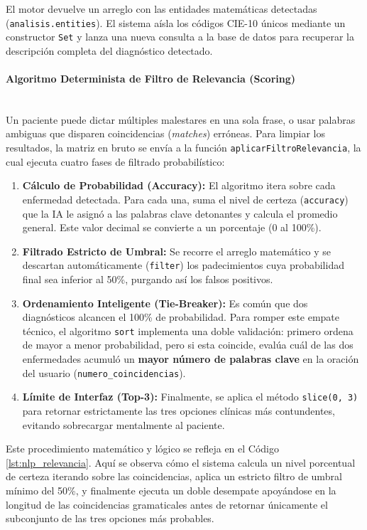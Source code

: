 El motor devuelve un arreglo con las entidades matemáticas detectadas (\texttt{analisis.entities}). El sistema aísla los códigos CIE-10 únicos mediante un constructor \texttt{Set} y lanza una nueva consulta a la base de datos para recuperar la descripción completa del diagnóstico detectado.

\paragraph{Algoritmo Determinista de Filtro de Relevancia (Scoring)} \leavevmode \\
Un paciente puede dictar múltiples malestares en una sola frase, o usar palabras ambiguas que disparen coincidencias (\emph{matches}) erróneas. Para limpiar los resultados, la matriz en bruto se envía a la función \texttt{aplicarFiltroRelevancia}, la cual ejecuta cuatro fases de filtrado probabilístico:

\begin{enumerate}
    \item \textbf{Cálculo de Probabilidad (Accuracy):} El algoritmo itera sobre cada enfermedad detectada. Para cada una, suma el nivel de certeza (\texttt{accuracy}) que la IA le asignó a las palabras clave detonantes y calcula el promedio general. Este valor decimal se convierte a un porcentaje (0 al 100\%).
    \item \textbf{Filtrado Estricto de Umbral:} Se recorre el arreglo matemático y se descartan automáticamente (\texttt{filter}) los padecimientos cuya probabilidad final sea inferior al 50\%, purgando así los falsos positivos.
    \item \textbf{Ordenamiento Inteligente (Tie-Breaker):} Es común que dos diagnósticos alcancen el 100\% de probabilidad. Para romper este empate técnico, el algoritmo \texttt{sort} implementa una doble validación: primero ordena de mayor a menor probabilidad, pero si esta coincide, evalúa cuál de las dos enfermedades acumuló un \textbf{mayor número de palabras clave} en la oración del usuario (\texttt{numero\_coincidencias}).
    \item \textbf{Límite de Interfaz (Top-3):} Finalmente, se aplica el método \texttt{slice(0, 3)} para retornar estrictamente las tres opciones clínicas más contundentes, evitando sobrecargar mentalmente al paciente.
\end{enumerate}

Este procedimiento matemático y lógico se refleja en el Código \ref{lst:nlp_relevancia}. Aquí se observa cómo el sistema calcula un nivel porcentual de certeza iterando sobre las coincidencias, aplica un estricto filtro de umbral mínimo del 50\%, y finalmente ejecuta un doble desempate apoyándose en la longitud de las coincidencias gramaticales antes de retornar únicamente el subconjunto de las tres opciones más probables. 

